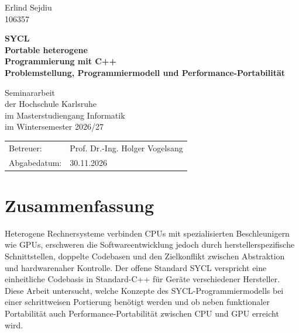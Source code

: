 \documentclass[12pt,a4paper]{article}
\begin{document}
\hypersetup{pageanchor=false}
\begin{titlepage}
    \raggedright
    Erlind Sejdiu\\
    106357
    \vspace*{3cm}

    \begin{center}
        {\LARGE\bfseries SYCL\\[0.3em]
        Portable heterogene\\
        Programmierung mit C++\\[0.4em]
        \large Problemstellung, Programmiermodell und Performance-Portabilität\par}
        \vspace{2cm}
        {\large Seminararbeit\\
        der Hochschule Karlsruhe\\
        im Masterstudiengang Informatik\\
        im Wintersemester 2026/27\par}
    \end{center}
    \vfill
    \begin{tabular}{@{}ll}
        Betreuer: & Prof. Dr.-Ing. Holger Vogelsang\\
        Abgabedatum: & 30.11.2026
    \end{tabular}
\end{titlepage}
\clearpage
\hypersetup{pageanchor=true}
\setcounter{page}{1}

\section*{Zusammenfassung}

Heterogene Rechnersysteme verbinden CPUs mit spezialisierten Beschleunigern wie GPUs, erschweren die Softwareentwicklung jedoch durch herstellerspezifische Schnittstellen, doppelte Codebasen und den Zielkonflikt zwischen Abstraktion und hardwarenaher Kontrolle. Der offene Standard SYCL verspricht eine einheitliche Codebasis in Standard-C++ für Geräte verschiedener Hersteller. Diese Arbeit untersucht, welche Konzepte des SYCL-Programmiermodells bei einer schrittweisen Portierung benötigt werden und ob neben funktionaler Portabilität auch Performance-Portabilität zwischen CPU und GPU erreicht wird.
\end{document}
